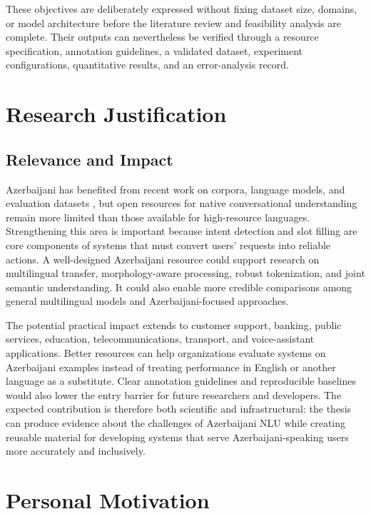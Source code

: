 \documentclass[12pt,a4paper]{article}
\begin{document}
These objectives are deliberately expressed without fixing dataset size, domains, or model architecture before the literature review and feasibility analysis are complete. Their outputs can nevertheless be verified through a resource specification, annotation guidelines, a validated dataset, experiment configurations, quantitative results, and an error-analysis record.

\section{Research Justification}

\subsection{Relevance and Impact}

Azerbaijani has benefited from recent work on corpora, language models, and evaluation datasets \citep{isbarov2024open}, but open resources for native conversational understanding remain more limited than those available for high-resource languages. Strengthening this area is important because intent detection and slot filling are core components of systems that must convert users' requests into reliable actions. A well-designed Azerbaijani resource could support research on multilingual transfer, morphology-aware processing, robust tokenization, and joint semantic understanding. It could also enable more credible comparisons among general multilingual models and Azerbaijani-focused approaches.

The potential practical impact extends to customer support, banking, public services, education, telecommunications, transport, and voice-assistant applications. Better resources can help organizations evaluate systems on Azerbaijani examples instead of treating performance in English or another language as a substitute. Clear annotation guidelines and reproducible baselines would also lower the entry barrier for future researchers and developers. The expected contribution is therefore both scientific and infrastructural: the thesis can produce evidence about the challenges of Azerbaijani NLU while creating reusable material for developing systems that serve Azerbaijani-speaking users more accurately and inclusively.

\section{Personal Motivation}
\end{document}
